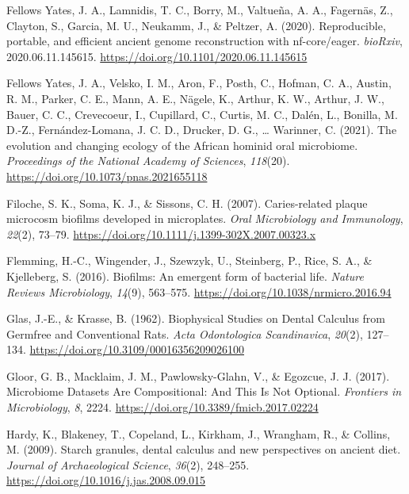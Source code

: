 \documentclass[
]{article}
\newlength{\cslhangindent}
\newlength{\cslentryspacingunit} %
\newenvironment{CSLReferences}[2] %
 {%
  \setlength{\parindent}{0pt}
  \ifodd #1
  \let\oldpar\par
  \def\par{\hangindent=\cslhangindent\oldpar}
  \fi
  \setlength{\parskip}{#2\cslentryspacingunit}
 }%
 {}
\begin{document}
\begin{CSLReferences}{1}{0}
\leavevmode{}%
Fellows Yates, J. A., Lamnidis, T. C., Borry, M., Valtueña, A. A.,
Fagernäs, Z., Clayton, S., Garcia, M. U., Neukamm, J., \& Peltzer, A.
(2020). Reproducible, portable, and efficient ancient genome
reconstruction with nf-core/eager. \emph{bioRxiv}, 2020.06.11.145615.
\url{https://doi.org/10.1101/2020.06.11.145615}

\leavevmode{}%
Fellows Yates, J. A., Velsko, I. M., Aron, F., Posth, C., Hofman, C. A.,
Austin, R. M., Parker, C. E., Mann, A. E., Nägele, K., Arthur, K. W.,
Arthur, J. W., Bauer, C. C., Crevecoeur, I., Cupillard, C., Curtis, M.
C., Dalén, L., Bonilla, M. D.-Z., Fernández-Lomana, J. C. D., Drucker,
D. G., \ldots{} Warinner, C. (2021). The evolution and changing ecology
of the {African} hominid oral microbiome. \emph{Proceedings of the
National Academy of Sciences}, \emph{118}(20).
\url{https://doi.org/10.1073/pnas.2021655118}

\leavevmode{}%
Filoche, S. K., Soma, K. J., \& Sissons, C. H. (2007). Caries-related
plaque microcosm biofilms developed in microplates. \emph{Oral
Microbiology and Immunology}, \emph{22}(2), 73--79.
\url{https://doi.org/10.1111/j.1399-302X.2007.00323.x}

\leavevmode{}%
Flemming, H.-C., Wingender, J., Szewzyk, U., Steinberg, P., Rice, S. A.,
\& Kjelleberg, S. (2016). Biofilms: An emergent form of bacterial life.
\emph{Nature Reviews Microbiology}, \emph{14}(9), 563--575.
\url{https://doi.org/10.1038/nrmicro.2016.94}

\leavevmode{}%
Glas, J.-E., \& Krasse, B. (1962). Biophysical {Studies} on {Dental
Calculus} from {Germfree} and {Conventional Rats}. \emph{Acta
Odontologica Scandinavica}, \emph{20}(2), 127--134.
\url{https://doi.org/10.3109/00016356209026100}

\leavevmode{}%
Gloor, G. B., Macklaim, J. M., Pawlowsky-Glahn, V., \& Egozcue, J. J.
(2017). Microbiome {Datasets Are Compositional}: {And This Is Not
Optional}. \emph{Frontiers in Microbiology}, \emph{8}, 2224.
\url{https://doi.org/10.3389/fmicb.2017.02224}

\leavevmode{}%
Hardy, K., Blakeney, T., Copeland, L., Kirkham, J., Wrangham, R., \&
Collins, M. (2009). Starch granules, dental calculus and new
perspectives on ancient diet. \emph{Journal of Archaeological Science},
\emph{36}(2), 248--255. \url{https://doi.org/10.1016/j.jas.2008.09.015}


\end{CSLReferences}
\end{document}
